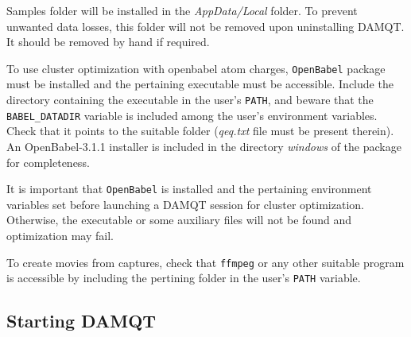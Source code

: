 \documentclass[10pt]{article}
\begin{document}
Samples folder will be installed in the {\it AppData/Local} folder.
To prevent unwanted data losses, this folder will not be removed upon uninstalling 
DAMQT. It should be removed by hand if required.

To use cluster optimization with openbabel atom charges, \texttt{OpenBabel} package must be installed
and the pertaining executable must be accessible. Include the directory containing the executable
in the user's \texttt{PATH}, and beware that the \texttt{BABEL\_DATADIR} variable is included
among the user's environment variables. Check that it points to the suitable folder ({\it qeq.txt} file 
must be present therein). An OpenBabel-3.1.1 installer is included in the directory 
{\it windows} of the package for completeness. 

It is important that \texttt{OpenBabel} is installed and the pertaining environment variables set before
launching a DAMQT session for cluster optimization. Otherwise, the executable or some auxiliary files
will not be found and optimization may fail.

To create movies from captures, check that \texttt{ffmpeg} or any other suitable program is accessible by
including the pertining folder in the user's \texttt{PATH} variable. 

\subsection{Starting DAMQT \label{sec:1.3}}
\end{document}
